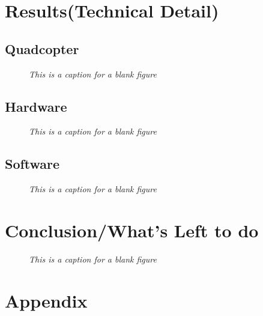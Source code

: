 \documentclass[11pt]{article}
\begin{document}

\section{Results(Technical Detail)}
\subsection{Quadcopter}

\blindtext

    \begin{figure}[H]
	\centering	
	\caption{\textit{This is a caption for a blank figure}}	
	\end{figure}

\subsection{Hardware}

\blindtext

    \begin{figure}[H]
	\centering	
	\caption{\textit{This is a caption for a blank figure}}	
	\end{figure}

\subsection{Software}

\blindtext

    \begin{figure}[H]
	\centering	
	\caption{\textit{This is a caption for a blank figure}}	
	\end{figure}



\section{Conclusion/What's Left to do}

\blindtext


     \begin{figure}[H]
	\centering	
	\caption{\textit{This is a caption for a blank figure}}	
	\end{figure}

\pagebreak

\section{Appendix}
\end{document}
